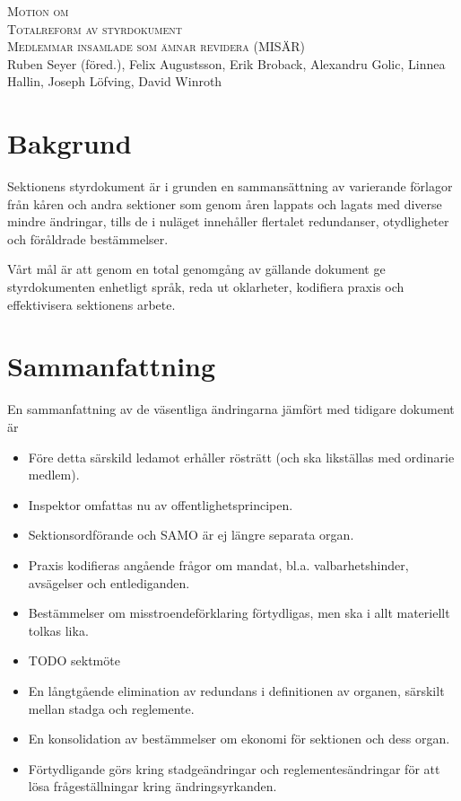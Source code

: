 \documentclass{article}
\newcommand{\motionsnamn}{Totalreform av styrdokument}
\newcommand{\motionar}{Medlemmar insamlade som ämnar revidera (MISÄR)}
\begin{document}
\begin{center}
\textsc{\Huge Motion om}\\[0.5cm]
\textsc{\huge \motionsnamn}\\[0.5cm]
\textsc{\large \motionar\\}
Ruben Seyer (föred.),
Felix Augustsson,
Erik Broback,
Alexandru Golic,
Linnea Hallin,
Joseph Löfving,
David Winroth
\end{center}

\section*{Bakgrund}
Sektionens styrdokument är i grunden en sammansättning av varierande förlagor från kåren och andra sektioner som genom åren lappats och lagats med diverse mindre ändringar, tills de i nuläget innehåller flertalet redundanser, otydligheter och föråldrade bestämmelser.

Vårt mål är att genom en total genomgång av gällande dokument ge styrdokumenten enhetligt språk, reda ut oklarheter, kodifiera praxis och effektivisera sektionens arbete.

\section*{Sammanfattning}
En sammanfattning av de väsentliga ändringarna jämfört med tidigare dokument är
\begin{itemize}
    \item Före detta särskild ledamot erhåller rösträtt (och ska likställas med ordinarie medlem).
    \item Inspektor omfattas nu av offentlighetsprincipen.
    \item Sektionsordförande och SAMO är ej längre separata organ.
    \item Praxis kodifieras angående frågor om mandat, bl.a. valbarhetshinder, avsägelser och entlediganden.
    \item Bestämmelser om misstroendeförklaring förtydligas, men ska i allt materiellt tolkas lika.
    \item TODO sektmöte
    \item En långtgående elimination av redundans i definitionen av organen, särskilt mellan stadga och reglemente.
    \item En konsolidation av bestämmelser om ekonomi för sektionen och dess organ.
    \item Förtydligande görs kring stadgeändringar och reglementesändringar för att lösa frågeställningar kring ändringsyrkanden.
\end{itemize}    
\end{document}
